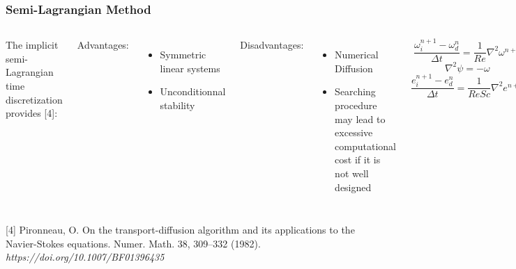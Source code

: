 \begin{frame} 
 \frametitle{\LARGE Semi-Lagrangian Method}

\begin{columns}[c]
\justifying
The implicit semi-Lagrangian time discretization provides [4]:

\medskip
Advantages:
\begin{itemize}
 \justifying
 \item Symmetric linear systems\\
 \item Unconditionnal stability
\end{itemize}

\vspace{0.5cm}
Disadvantages:
\begin{itemize}
 \justifying
 \item Numerical Diffusion\\
 \item Searching procedure may lead to excessive computational cost
       if it is not well designed
\end{itemize}


\begin{equation*}
 \frac{\omega_{i}^{n+1} - \omega_{d}^{n}}{\Delta t} = \frac{1}{Re} \nabla^{2} \omega^{n+1}
\end{equation*}
\begin{equation*}
 \nabla^{2} \psi = - \omega
\end{equation*}
\begin{equation*}
 \frac{e_{i}^{n+1} - e_{d}^{n}}{\Delta t} = \frac{1}{ReSc} \nabla^{2} e^{n+1}
\end{equation*}
\end{columns}


\vspace{0.6cm}
\justifying
\tiny [4]
Pironneau, O. On the transport-diffusion algorithm and its applications to the Navier-Stokes equations. Numer. Math. 38, 309–332 (1982). \textit{https://doi.org/10.1007/BF01396435}
\end{frame}






